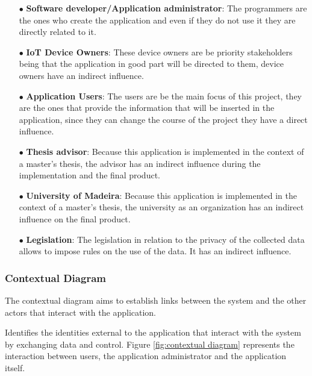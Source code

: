 \begin{itemize}
    \item[$\bullet$] \textbf{Software developer/Application administrator}: The programmers are the ones who create the application and even if they do not use it they are directly related to it.
    \item[$\bullet$] \textbf{IoT Device Owners}: These device owners are be priority stakeholders being that the application in good part will be directed to them, device owners have an indirect influence.
    \item[$\bullet$] \textbf{Application Users}: The users are be the main focus of this project, they are the ones that provide the information that will be inserted in the application, since they can change the course of the project they have a direct influence.
    \item[$\bullet$] \textbf{Thesis advisor}: Because this application is implemented in the context of a master's thesis, the advisor has an indirect influence during the implementation and the final product.
    \item[$\bullet$] \textbf{University of Madeira}: Because this application is implemented in the context of a master's thesis, the university as an organization has an indirect influence on the final product.
    \item[$\bullet$] \textbf{Legislation}: The legislation in relation to the privacy of the collected data allows to impose rules on the use of the data. It has an indirect influence.
\end{itemize}

\subsubsection{Contextual Diagram}

The contextual diagram aims to establish links between the system
and the other actors that interact with the application.

Identifies the identities external to the application that interact with
the system by exchanging data and control.
Figure \ref{fig:contextual diagram} represents the interaction between users, the
application administrator and the application itself.

